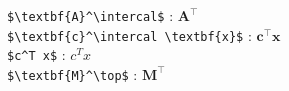 \documentclass{article}
\begin{document}
\noindent \verb!$\textbf{A}^\intercal$! : $\textbf{A}^\intercal$
\\
\verb!$\textbf{c}^\intercal \textbf{x}$! : $\textbf{c}^\intercal \textbf{x}$
\\
\verb!$c^T x$! : $c^T x$
\\
\verb!$\textbf{M}^\top$! : $\textbf{M}^\top$
\end{document}
